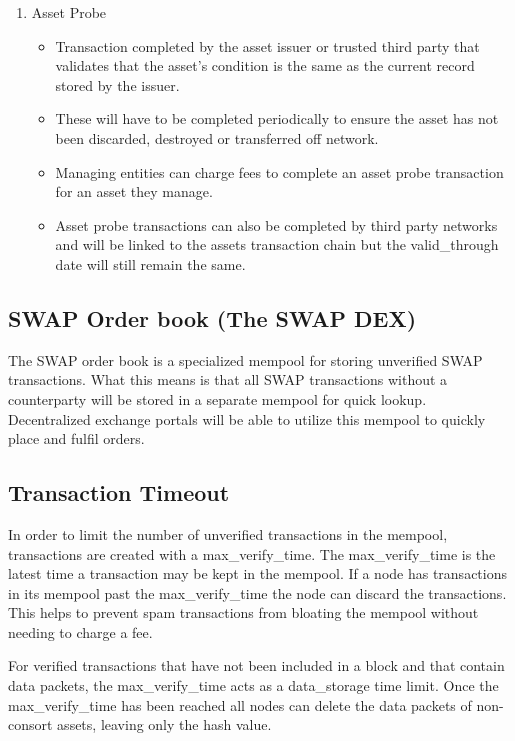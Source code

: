 \documentclass[12pt]{article}
\begin{document}
\begin{enumerate}
	\item Asset Probe
		\begin{itemize}
			\item{Transaction completed by the asset issuer or 
				trusted third party that validates that the asset's condition 
				is the same as the current record stored by the issuer.}
			\item{These will have to be 
				completed periodically to ensure the asset has not been 
				discarded, destroyed or transferred off network.}
			\item{Managing 
				entities can charge fees to complete an asset probe transaction 
				for an asset they manage.}
			\item{Asset probe transactions can also 
				be completed by third party networks and will be linked to 
				the assets transaction chain but the valid\_through date 
				will still remain the same.}
		\end{itemize}
\end{enumerate}


\subsection{SWAP Order book (The SWAP DEX)}
The SWAP order book is a specialized mempool for storing unverified SWAP transactions.  What this means is that
all SWAP transactions without a counterparty will be stored in a separate mempool for quick lookup. 
Decentralized exchange portals will be able to utilize this mempool to quickly place and fulfil orders.


\subsection{Transaction Timeout}


In order to limit the number of unverified transactions in the mempool, 
transactions are created with a max\_verify\_time.  The max\_verify\_time
is the latest time a transaction may be kept in the mempool.  If a node has 
transactions in its mempool past the max\_verify\_time the node can discard 
the transactions.  This helps to prevent spam transactions from bloating the 
mempool without needing to charge a fee.

For verified transactions 
that have not been included in a block and that contain data packets, the max\_verify\_time
acts as a data\_storage time limit.  Once the max\_verify\_time has been reached all nodes 
can delete the data packets of non-consort assets, leaving only the hash value.
\end{document}
